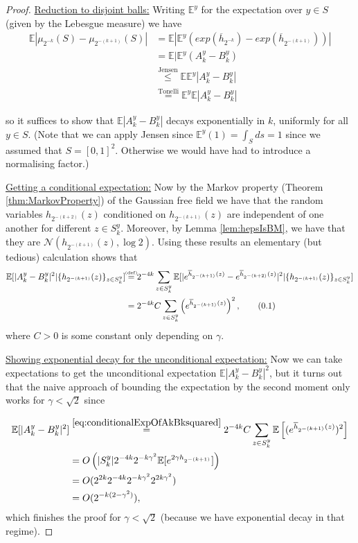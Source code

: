 \documentclass[11pt,reqno]{amsart}
\numberwithin{equation}{section}
\newcommand{\eqby}[1]{\mathrel{\stackrel{#1}{=}}}
\newcommand{\eqbydef}{\mathrel{\stackrel{\hspace*{-3mm}\text{\tiny(def)}\hspace*{-3mm}}{=}}}
\newcommand{\leqby}[1]{\mathrel{\stackrel{#1}{\leq}}}
\newcommand\numberthis{\addtocounter{equation}{1}\tag{\theequation}} %
\renewcommand\theequation{{\thesection}%
                   .{\arabic{equation}}}
\begin{document}
\begin{proof}
	\underline{Reduction to disjoint balls:} Writing $\mathbb E^y$ for the expectation over $y\in S$ (given by the Lebesgue measure) we have \begin{align*}
		\mathbb E|\mu_{2^{-k}}(S)-\mu_{2^{-(k+1)}}(S)| &= \mathbb E|\mathbb E^y(exp(\overline h_{2^{-k}})-exp(\overline h_{2^{-(k+1)}}))|\\
		&=\mathbb E|\mathbb E^y(A_k^y-B_k^y)\\
		&\leqby{\text{Jensen}}\mathbb E\mathbb E^y|A_k^y-B_k^y|\\
		&\eqby{\text{Tonelli}}\mathbb E^y\mathbb E|A_k^y-B_k^y|
	\end{align*}
	
	so it suffices to show that $\mathbb E|A_k^y-B_k^y|$ decays exponentially in $k$, uniformly for all $y\in S$. (Note that we can apply Jensen since $\mathbb E^y(1)=\int_S ds=1$ since we assumed that $S=[0,1]^2$. Otherwise we would have had to introduce a normalising factor.)
	
	\underline{Getting a conditional expectation:} Now by the Markov property (Theorem \ref{thm:MarkovProperty}) of the Gaussian free field we have that the random variables $h_{2^{-(k+2)}}(z)$ conditioned on $h_{2^{-(k+1)}}(z)$ are independent of one another for different $z\in S_k^y$. Moreover, by Lemma \ref{lem:hepsIsBM}, we have that they are $\mathcal N(h_{2^{-(k+1)}}(z),\log 2)$. Using these results an elementary (but tedious) calculation shows that
	\begin{align*}
		\mathbb E[|A_k^y-B_k^y|^2|\{h_{2^{-(k+1)}}(z)\}_{z\in S_k^y}] &\eqbydef 2^{-4k}\sum_{z\in S_k^y}\mathbb E[|e^{\overline h_{2^{-(k+1)}}(z)}-e^{\overline h_{2^{-(k+2)}}(z)}|^2|\{h_{2^{-(k+1)}}(z)\}_{z\in S_k^y}]\\
		&=2^{-4k}C\sum_{z\in S_k^y}\left(e^{\overline h_{2^{-(k+1)}}(z)}\right)^2,\numberthis \label{eq:conditionalExpOfAkBksquared}
	\end{align*}
	where $C>0$ is some constant only depending on $\gamma$.
	
	\underline{Showing exponential decay for the unconditional expectation:} Now we can take expectations to get the unconditional expectation $\mathbb E|A_k^y-B_k^y|^2$, but it turns out that the naive approach of bounding the expectation by the second moment only works for $\gamma<\sqrt 2$ since
	
	\begin{align*}
		\mathbb E[|A_k^y-B_k^y|^2] &\eqby{\eqref{eq:conditionalExpOfAkBksquared}}
		2^{-4k}C\sum_{z\in S_k^y}\mathbb E\left[(e^{\overline h_{2^{-(k+1)}}(z)})^2\right]\\
		&= O\left(|S_k^y|2^{-4k}2^{-k\gamma^2}\mathbb E[e^{2\gamma h_{2^{-(k+1)}}}]\right) \\
		&= O(2^{2k}2^{-4k}2^{-k\gamma^2}2^{2k\gamma^2})\\
		&= O(2^{-k(2-\gamma^2)}),
	\end{align*}
	which finishes the proof for $\gamma<\sqrt 2$ (because we have exponential decay in that regime).
	

\end{proof}
\end{document}
